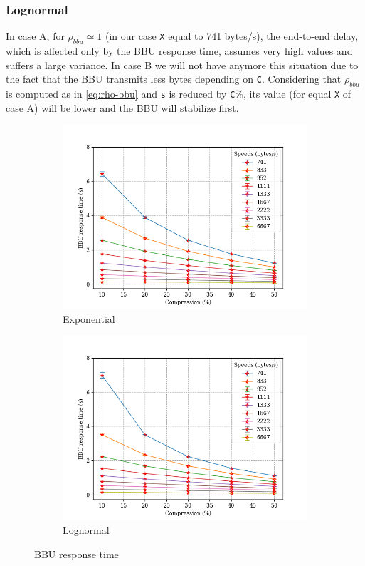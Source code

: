 \documentclass[11pt,a4paper,oneside, openright]{article}
\begin{document}
\subsubsection{Lognormal}
In case A, for $\rho_{bbu} \simeq 1$ (in our case \texttt{X} equal to 741 bytes/s), the end-to-end delay, which is affected only by the BBU response time, assumes very high values and suffers a large variance. In case B we will not have anymore this situation due to the fact that the BBU transmits less bytes depending on \texttt{C}. Considering that $\rho_{bbu}$ is computed as in \eqref{eq:rho-bbu} and \texttt{s} is reduced by \texttt{C}\%, its value (for equal \texttt{X} of case A) will be lower and the BBU will stabilize first.
\begin{figure}[h]
	\centering
	\begin{subfigure}{.5\textwidth}
		\centering
		\includegraphics[width=\linewidth]{images/bbu-exp}
		\caption{Exponential}
		\label{fig:exponential-bbu-response}
	\end{subfigure}%
	\begin{subfigure}{.5\textwidth}
		\centering
		\includegraphics[width=\linewidth]{images/bbu-logn}
		\caption{Lognormal}
		\label{fig:lognormal-bbu-response}
	\end{subfigure}
	\caption{BBU response time}
	\label{fig:bbu-response}
\end{figure}
\end{document}
